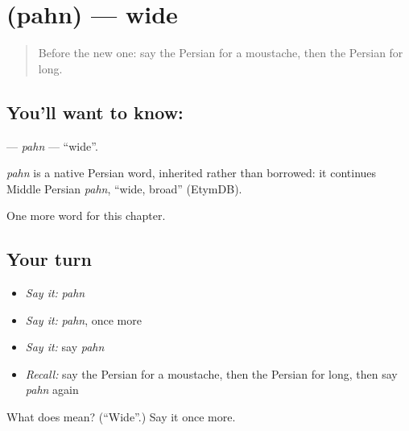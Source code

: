 \section[\texorpdfstring{\fa{پهن} (pahn)}{پهن (pahn)}]{ (pahn) — wide}

\label{lesson:FA-C123-pahn}



\begin{quote}
Before the new one: say the Persian for a moustache, then the Persian for long.
\end{quote}

\subsection*{You'll want to know: }
\textbf{} — \emph{pahn} — \textquotedblleft{}wide\textquotedblright{}.

\begin{cousinweb}
\emph{pahn} is a native Persian word, inherited rather than borrowed: it continues Middle Persian \emph{pahn}, \textquotedblleft{}wide, broad\textquotedblright{} (EtymDB).
\end{cousinweb}

\begin{grammarlens}[title={What you've built}]
One more word for this chapter.
\end{grammarlens}

\subsection*{Your turn}
\begin{itemize}
\raggedright
  \item \emph{Say it:} \emph{pahn}
  \item \emph{Say it:} \emph{pahn}, once more
  \item \emph{Say it:} say \emph{pahn}
  \item \emph{Recall:} say the Persian for a moustache, then the Persian for long, then say \emph{pahn} again
\end{itemize}

\begin{tcolorbox}[breakable,colback=teal!4,colframe=teal!35!black,title={Before you move on}]
What does  mean? (\textquotedblleft{}Wide\textquotedblright{}.) Say it once more.
\end{tcolorbox}
